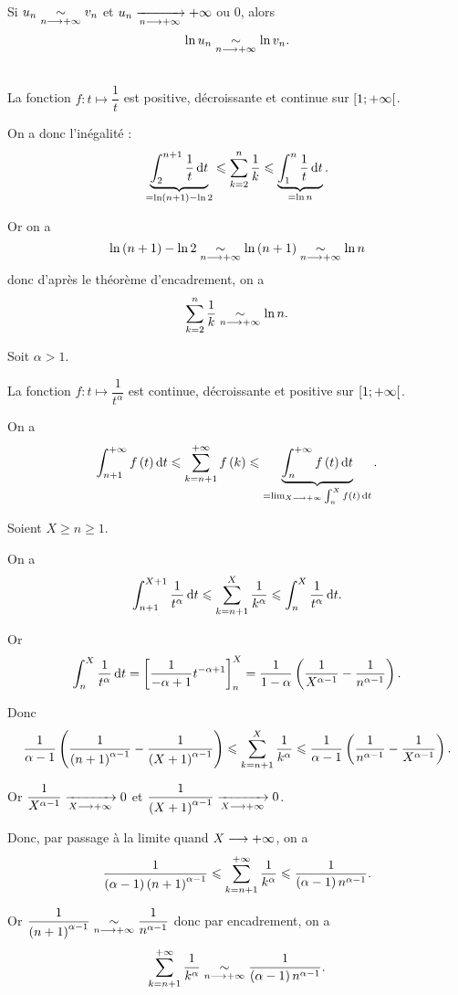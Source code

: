 \begin{rappel}
Si \(u_n\underset{n\longrightarrow+\infty}{\sim}v_n\) et \(u_n\xrightarrow[n\longrightarrow+\infty]{}+\infty\) ou \(0\), alors \[\ln u_n\underset{n\longrightarrow+\infty}{\sim}\ln v_n.\]
\end{rappel}

\begin{dem}~\\
La fonction \(f:t\mapsto\dfrac{1}{t}\) est positive, décroissante et continue sur \(\left[1;+\infty\right[\).

On a donc l'inégalité : \[\underbrace{\int_2^{n+1}\dfrac{1}{t}\odif{t}}_{=\ln\paren{n+1}-\ln2}\leq\sum_{k=2}^n\dfrac{1}{k}\leq\underbrace{\int_1^n\dfrac{1}{t}\odif{t}}_{=\ln n}.\]

Or on a \[\ln\left(n+1\right)-\ln2\underset{n\longrightarrow+\infty}{\sim}\ln\left(n+1\right)\underset{n\longrightarrow+\infty}{\sim}\ln n\] donc d'après le théorème d'encadrement, on a \[\sum_{k=2}^n\dfrac{1}{k}\underset{n\longrightarrow+\infty}{\sim}\ln n.\]
\end{dem}

\begin{dem}
Soit \(\alpha>1\).

La fonction \(f:t\mapsto\dfrac{1}{t^\alpha}\) est continue, décroissante et positive sur \(\left[1;+\infty\right[\).

On a \[\int_{n+1}^{\pinf}f\paren{t}\odif{t}\leq\sum_{k=n+1}^{\pinf}f\paren{k}\leq\underbrace{\int_n^{\pinf}f\paren{t}\odif{t}}_{=\lim_{X\to\pinf}\int_n^Xf\paren{t}\odif{t}}.\]

Soient \(X\geq n\geq1\).

On a \[\int_{n+1}^{X+1}\dfrac{1}{t^\alpha}\odif{t}\leq\sum_{k=n+1}^X\dfrac{1}{k^\alpha}\leq\int_n^X\dfrac{1}{t^\alpha}\odif{t}.\]

Or \[\int_n^X\dfrac{1}{t^\alpha}\odif{t}=\croch{\dfrac{1}{-\alpha+1}t^{-\alpha+1}}_n^X=\dfrac{1}{1-\alpha}\paren{\dfrac{1}{X^{\alpha-1}}-\dfrac{1}{n^{\alpha-1}}}.\]

Donc \[\dfrac{1}{\alpha-1}\left(\dfrac{1}{\left(n+1\right)^{\alpha-1}}-\dfrac{1}{\left(X+1\right)^{\alpha-1}}\right)\leqslant\sum_{k=n+1}^X\dfrac{1}{k^\alpha}\leqslant\dfrac{1}{\alpha-1}\left(\dfrac{1}{n^{\alpha-1}}-\dfrac{1}{X^{\alpha-1}}\right).\]

Or \(\dfrac{1}{X^{\alpha-1}}\xrightarrow[X\longrightarrow+\infty]{}0\) et \(\dfrac{1}{\left(X+1\right)^{\alpha-1}}\xrightarrow[X\longrightarrow+\infty]{}0\).

Donc, par passage à la limite quand \(X\longrightarrow+\infty\), on a \[\dfrac{1}{\left(\alpha-1\right)\left(n+1\right)^{\alpha-1}}\leqslant\sum_{k=n+1}^{+\infty}\dfrac{1}{k^\alpha}\leqslant\dfrac{1}{\left(\alpha-1\right)n^{\alpha-1}}.\]

Or \(\dfrac{1}{\left(n+1\right)^{\alpha-1}}\underset{n\longrightarrow+\infty}{\sim}\dfrac{1}{n^{\alpha-1}}\) donc par encadrement, on a \[\sum_{k=n+1}^{+\infty}\dfrac{1}{k^\alpha}\underset{n\longrightarrow+\infty}{\sim}\dfrac{1}{\left(\alpha-1\right)n^{\alpha-1}}.\]
\end{dem}

